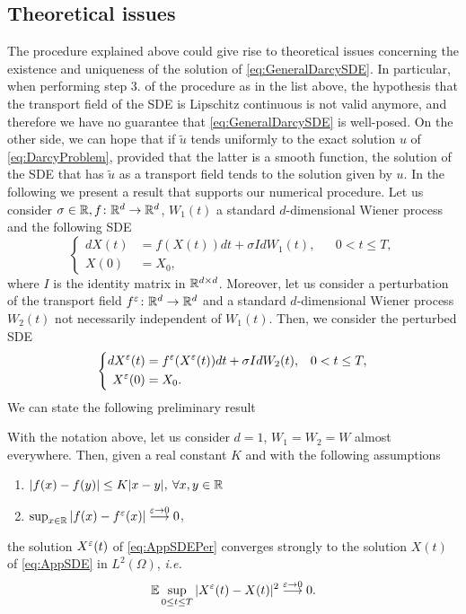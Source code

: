 \subsection{Theoretical issues}
The procedure explained above could give rise to theoretical issues concerning the existence and uniqueness of the solution of \eqref{eq:GeneralDarcySDE}. In particular, when performing step 3. of the procedure as in the list above, the hypothesis that the transport field of the SDE is Lipschitz continuous is not valid anymore, and therefore we have no guarantee that \eqref{eq:GeneralDarcySDE} is well-posed. On the other side, we can hope that if $\tilde{u}$ tends uniformly to the exact solution $u$ of \eqref{eq:DarcyProblem}, provided that the latter is a smooth function, the solution of the SDE that has $\tilde{u}$ as a transport field tends to the solution given by $u$. In the following we present a result that supports our numerical procedure. Let us consider $\sigma \in \mathbb{R}, f\colon \mathbb{R}^d \rightarrow \mathbb{R}^d$, $W_1(t)$ a standard $d$-dimensional Wiener process and the following SDE
\begin{equation}\label{eq:AppSDE}
\left \{
\begin{aligned}
	dX(t) &= f(X(t))dt + \sigma IdW_1(t), && 0 < t \leq T, \\
	X(0) &= X_0,
\end{aligned} \right .
\end{equation}
where $I$ is the identity matrix in $\mathbb{R}^{d\times d}$. Moreover, let us consider a perturbation of the transport field $f^\varepsilon\colon \mathbb{R}^d \rightarrow \mathbb{R}^d$ and a standard $d$-dimensional Wiener process $W_2(t)$ not necessarily independent of $W_1(t)$. Then, we consider the perturbed SDE 
\begin{equation}\label{eq:AppSDEPer}
\left \{
\begin{aligned}
	dX^\varepsilon(t) &= f^\varepsilon(X^\varepsilon(t))dt + \sigma I dW_2(t), && 0 < t \leq T, \\
	X^\varepsilon(0) &= X_0.
\end{aligned} \right .
\end{equation}
We can state the following preliminary result
\begin{lemma}\label{lem:Lemma1} With the notation above, let us consider $d = 1$, $W_1 = W_2 = W$ almost everywhere. Then, given a real constant $K$ and with the following assumptions
\begin{enumerate}
	\item $|f(x) - f(y)| \leq K|x - y|, \: \forall x,y \in \mathbb{R}$
 	\item $\sup_{x\in \mathbb{R}}|f(x) - f^\varepsilon(x)| \stackrel{\varepsilon \rightarrow 0}\longrightarrow 0$,
\end{enumerate}
the solution $X^\varepsilon(t)$ of \eqref{eq:AppSDEPer} converges strongly to the solution $X(t)$ of \eqref{eq:AppSDE} in $L^2(\Omega)$, \textit{i.e.}
\begin{equation*}
	\mathbb{E} \sup_{0 \leq t \leq T} |X^\varepsilon(t) - X(t)|^2 \stackrel{\varepsilon \rightarrow 0}\longrightarrow 0.
\end{equation*}
\end{lemma}

